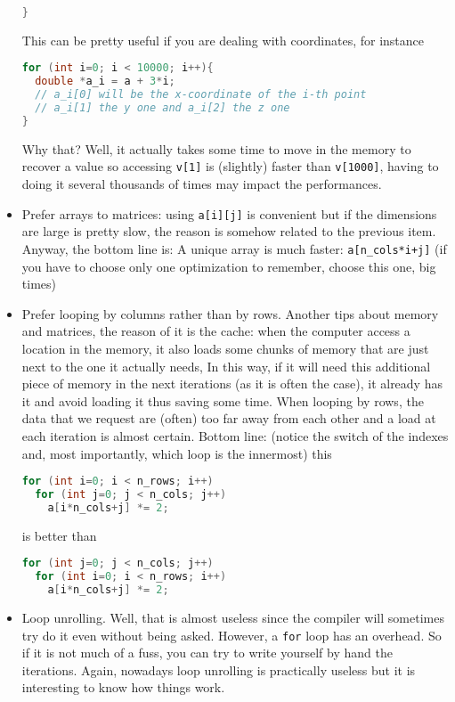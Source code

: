 \documentclass[a4paper,12pt,%
              final%
              ]{article}
\begin{document}
\begin{itemize}
\begin{lstlisting}[language=C]
}
\end{lstlisting}
        This can be pretty useful if you are dealing with coordinates, for instance
\begin{lstlisting}[language=C]
for (int i=0; i < 10000; i++){
  double *a_i = a + 3*i;
  // a_i[0] will be the x-coordinate of the i-th point
  // a_i[1] the y one and a_i[2] the z one
}
\end{lstlisting}
        Why that? Well, it actually takes some time to move in the memory to recover a value so accessing \texttt{v[1]} is (slightly) faster than \texttt{v[1000]}, having to doing it several thousands of times may impact the performances.
      \item Prefer arrays to matrices: using \verb|a[i][j]| is convenient but if the dimensions are large is pretty slow, the reason is somehow related to the previous item. Anyway, the bottom line is: A unique array is much faster: \verb|a[n_cols*i+j]| (if you have to choose only one optimization to remember, choose this one, big times)
      \item Prefer looping by columns rather than by rows. Another tips about memory and matrices, the reason of it is the cache: when the computer access a location in the memory, it also loads some chunks of memory that are just next to the one it actually needs, In this way, if it will need this additional piece of memory in the next iterations (as it is often the case), it already has it and avoid loading it thus saving some time. When looping by rows, the data that we request are (often) too far away from each other and a load at each iteration is almost certain. Bottom line: (notice the switch of the indexes and, most importantly, which loop is the innermost) this
\begin{lstlisting}[language=C]
for (int i=0; i < n_rows; i++)
  for (int j=0; j < n_cols; j++)
    a[i*n_cols+j] *= 2;
\end{lstlisting}
        is better than
\begin{lstlisting}[language=C]
for (int j=0; j < n_cols; j++)
  for (int i=0; i < n_rows; i++)
    a[i*n_cols+j] *= 2;
\end{lstlisting}
      \item Loop unrolling. Well, that is almost useless since the compiler will sometimes try do it even without being asked. However, a \texttt{for} loop has an overhead. So if it is not much of a fuss, you can try to write yourself by hand the iterations. Again, nowadays loop unrolling is practically useless but it is interesting to know how things work.

\end{itemize}
\end{document}
